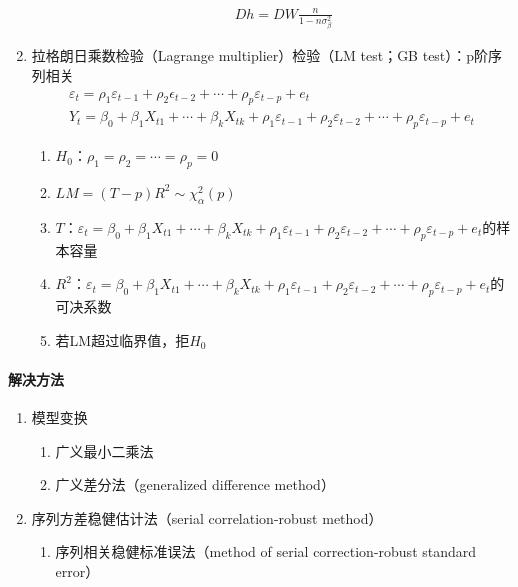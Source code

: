 \documentclass[12pt]{book}
\begin{document}
\begin{enumerate}[1.]
\begin{enumerate}[(1)]
        \begin{gather*}
            Dh=DW\frac{n}{1-n\sigma_\beta^2}
        \end{gather*} 
    \end{enumerate}
    \item 拉格朗日乘数检验（Lagrange multiplier）检验（LM test；GB test）：p阶序列相关
    \begin{gather*}
        \varepsilon_t=\rho_1\varepsilon_{t-1}+\rho_2\epsilon_{t-2}+\cdots+\rho_p\varepsilon_{t-p}+e_t\\ 
        Y_t=\beta_0+\beta_1X_{t1}+\cdots+\beta_kX_{tk}+\rho_1\varepsilon_{t-1}+\rho_2\varepsilon_{t-2}+\cdots+\rho_p\varepsilon_{t-p}+e_t
    \end{gather*}
    \begin{enumerate}[(1)]
        \item $H_0$：$\rho_1=\rho_2=\cdots=\rho_p=0$
        \item $LM={(T-p)R}^2\sim\chi_\alpha^2(p)$
        \item $T$：$\varepsilon_t=\beta_0+\beta_{1}X_{t1}+\cdots+\beta_{k}X_{tk}+\rho_{1}\varepsilon_{t-1}+\rho_{2}\varepsilon_{t-2}+\cdots+\rho_{p}\varepsilon_{t-p}+e_{t}$的样本容量
        \item $R^2$：$\varepsilon_t=\beta_0+\beta_1X_{t1}+\cdots+\beta_kX_{tk}+\rho_1\varepsilon_{t-1}+\rho_{2}\varepsilon_{t-2}+\cdots+\rho_{p}\varepsilon_{t-p}+e_{t}$的可决系数
        \item 若LM超过临界值，拒$H_0$
    \end{enumerate}
\end{enumerate}


\paragraph{解决方法}

\begin{enumerate}[1.]
    \item 模型变换
          \begin{enumerate}[(1)]
              \item 广义最小二乘法
              \item 广义差分法（generalized difference method）
          \end{enumerate}
    \item 序列方差稳健估计法（serial correlation-robust method）
          \begin{enumerate}[(1)]
              \item 序列相关稳健标准误法（method of serial correction-robust standard error）
          \end{enumerate}
\end{enumerate}
\end{document}
